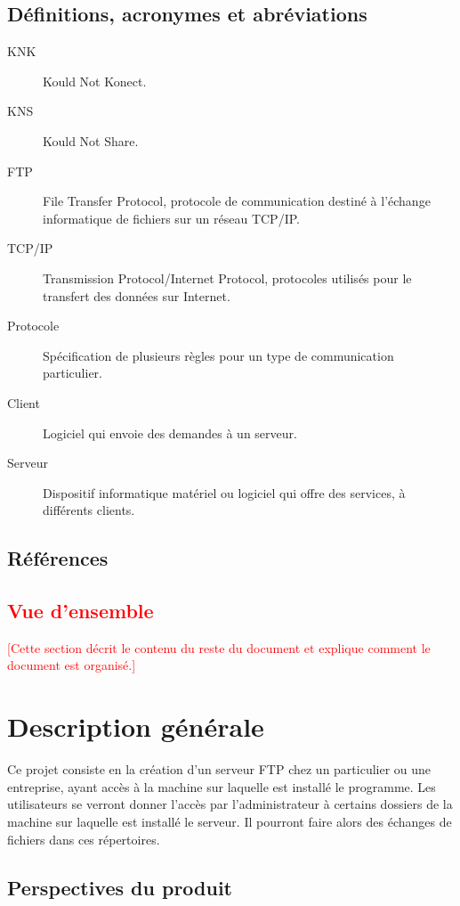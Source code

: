 \documentclass[10pt,a4paper]{report}
\begin{document}
\subsection{Définitions, acronymes et abréviations}
\begin{description}
\item[KNK] Kould Not Konect.
\item[KNS] Kould Not Share.
\item[FTP] File Transfer Protocol, protocole de communication destiné à l'échange informatique de fichiers sur un réseau TCP/IP.
\item[TCP/IP] Transmission Protocol/Internet Protocol, protocoles utilisés pour le transfert des données sur Internet.
\item[Protocole] Spécification de plusieurs règles pour un type de communication particulier.
\item[Client] Logiciel qui envoie des demandes à un serveur.
\item[Serveur] Dispositif informatique matériel ou logiciel qui offre des services, à différents clients.
\end{description}

\subsection{Références}

\textcolor{red}{\subsection{Vue d’ensemble}
[Cette section décrit le contenu du reste du document et explique comment le document est organisé.]}

\section{Description générale}

Ce projet consiste en la création d'un serveur FTP chez un particulier ou une entreprise, ayant accès à la machine sur laquelle est installé le programme. Les utilisateurs se verront donner l'accès par l'administrateur à certains dossiers de la machine sur laquelle est installé le serveur. Il pourront faire alors des échanges de fichiers dans ces répertoires.

\subsection{Perspectives du produit}
\end{document}
